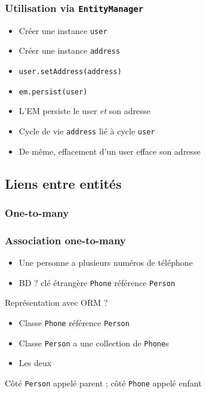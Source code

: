 \documentclass[french, english]{beamer}
\begin{document}
\begin{frame}
	\frametitle{Utilisation via \texttt{EntityManager}}
	\begin{itemize}
		\item Créer une instance \texttt{user}
		\item Créer une instance \texttt{address}
		\item \texttt{user.setAddress(address)}
		\item \texttt{em.persist(user)}
		\item L’EM persiste le user \emph{et} son adresse
		\item Cycle de vie \texttt{address} lié à cycle \texttt{user}
		\item De même, effacement d’un user efface son adresse
	\end{itemize}
\end{frame}

\subsection{Liens entre entités}
\subsubsection{One-to-many}
\begin{frame}
	\frametitle{Association one-to-many}
	\begin{itemize}
		\item Une personne a plusieurs numéros de téléphone
		\item BD ? \pause clé étrangère \texttt{Phone} référence \texttt{Person}
	\end{itemize}
	\pause
	
	\vspace{1em}
	Représentation avec ORM ? \pause
	\begin{itemize}
		\item Classe \texttt{Phone} référence \texttt{Person}
		\item Classe \texttt{Person} a une collection de \texttt{Phone}s
		\item Les deux
	\end{itemize}
	Côté \texttt{Person} appelé parent ; côté \texttt{Phone} appelé enfant
\end{frame}
\end{document}
